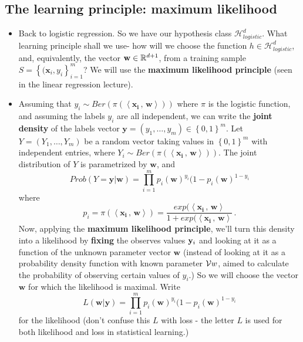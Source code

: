 \documentclass[11pt]{article}
\newcommand{\Hc}{\mathcal{H}}
\newcommand{\innerr}[2]{{\left\langle #1\,,\,#2 \right\rangle}}
\newcommand{\VV}[1]{\mathbf{#1}}
\begin{document}
  \subsection{The learning principle: maximum likelihood}
  \begin{itemize}
    \item Back to logistic regression. So we have our hypothesis class 
      $\Hc_{logistic}^d$. What learning principle shall we use- how will we
      choose the function $h\in \Hc_{logistic}^d$, and, equivalently, the vector 
      $\VV{w}\in\reals^{d+1}$, from a training sample 
      $S=\left\{ (\VV{x}_i,y_i \right\}_{i=1}^m$?
      We will use the {\bf maximum likelihood principle} (seen in the
      linear regression lecture).
    \item Assuming that $y_i \sim Ber(\pi
      (\innerr{\VV{x_i}}{\VV{w}} ))$ where $\pi$ is the logistic function, and
      assuming the labels $y_i$ are all independent, we can write the {\bf joint
      density} of the labels vector $\VV{y}=(y_1,\ldots,y_m)\in\left\{ 0,1
      \right\}^m$. Let $Y=(Y_1,\ldots,Y_m)$ be a random vector taking values in
      $\left\{ 0,1 \right\}^m$ with independent entries, where
      $Y_i \sim Ber(\pi
      (\innerr{\VV{x_i}}{\VV{w}} ))$. The joint distribution of $Y$ is parametrized
      by $\VV{w}$, and 
      \[
	Prob(Y=\VV{y} | \VV{w}) = \prod_{i=1}^m p_i(\VV{w})^{y_i} (1-p_i(\VV{w})^{1-y_i}
      \]
      where 
      \[p_i = \pi
      (\innerr{\VV{x_i}}{\VV{w}} ) = 
      \frac{exp(\innerr{\VV{x_i}}{\VV{w}}}{1+exp(\innerr{\VV{x_i}}{\VV{w}}}\,.
    \]
      Now, applying the {\bf maximum likelihood principle}, we'll turn this
      density into a likelihood by {\bf fixing} the observes values ${\mathbf y}_i$ and
      looking at it as a function of the unknown parameter vector $\VV{w}$
      (instead of looking at it as a probability density function with known
	parameter $\mathcal{V}{w}$, aimed to calculate the probability of observing
      certain values of $y_i$.)
      So we will choose the vector $\VV{w}$ for which the likelihood is maximal.
      Write
      \[
	L(\VV{w} | \VV{y}) = \prod_{i=1}^m p_i(\VV{w})^{y_i} (1-p_i(\VV{w})^{1-y_i}
      \]
      for the likelihood (don't confuse this $L$ with loss - the letter $L$ is used for both
      likelihood and loss in statistical learning.)

\end{itemize}
\end{document}
